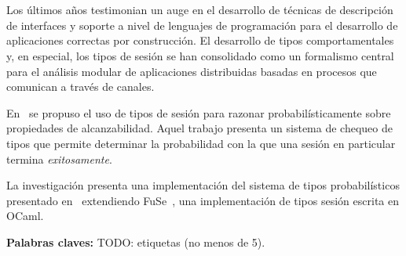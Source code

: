 \chapter*{\runtitulo}

Los últimos años testimonian un auge en el desarrollo de técnicas de
descripción de interfaces y soporte a nivel de lenguajes de
programación para el desarrollo de aplicaciones correctas por construcción. El
desarrollo de tipos comportamentales y, en especial, los tipos de sesión
se han consolidado como un formalismo central para el análisis modular de
aplicaciones distribuidas basadas en procesos que comunican a través de canales.

En~\cite{DBLP:conf/concur/InversoMPTT20} se propuso el uso de tipos de sesión
para razonar probabilísticamente sobre propiedades de alcanzabilidad. Aquel
trabajo presenta un sistema de chequeo de tipos que permite determinar la
probabilidad con la que una sesión en particular termina \emph{exitosamente}.

La investigación presenta una implementación del sistema de tipos
probabilísticos presentado en~\cite{DBLP:conf/concur/InversoMPTT20} extendiendo
FuSe~\cite{DBLP:journals/jfp/Padovani17}, una implementación de tipos sesión
escrita en OCaml.

\bigskip

\noindent\textbf{Palabras claves:} TODO: etiquetas (no menos de 5).